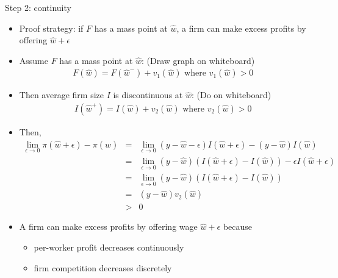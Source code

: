 \documentclass[9pt]{beamer}
\newcommand{\bit}{\begin{itemize}}
\newcommand{\eit}{\end{itemize}}
\newcommand{\rc}{\color{red}}
\begin{document}
\begin{frame}{Step 2: continuity}

\bit
\setlength\itemsep{1em}

\item Proof strategy: if $F$ has a mass point at $\hat w$, a firm can make excess profits by offering $\hat w + \epsilon$

\item Assume $F$ has a mass point at $\hat w$: {\rc (Draw graph on whiteboard)}
\begin{eqnarray}
F(\hat w) = F(\hat w^{-}) + v_1(\hat w) \text{  where $v_1(\hat w)>0$ }\nonumber
\end{eqnarray}

\item Then average firm size $I$ is discontinuous at $\hat w$: {\rc (Do on whiteboard)}
\begin{eqnarray}
I(\hat w^{+}) = I(\hat w) + v_2(\hat w) \text{  where $v_2(\hat w)>0$ } \nonumber
\end{eqnarray}

\item Then,
\begin{eqnarray}
\lim\limits_{\epsilon \rightarrow 0} \pi(\hat w+\epsilon)-\pi(\hat w) &=& \lim\limits_{\epsilon \rightarrow 0} (y-\hat w-\epsilon) I(\hat{w}+\epsilon) - (y-\hat w) I(\hat{w}) \nonumber \\
&=& \lim\limits_{\epsilon \rightarrow 0} (y-\hat w)(I(\hat{w}+\epsilon)-I(\hat{w})) -\epsilon I(\hat{w}+\epsilon) \nonumber \\
&=& \lim\limits_{\epsilon \rightarrow 0}  (y-\hat w)(I(\hat{w}+\epsilon)-I(\hat{w})) \nonumber \\ 
&=& (y-\hat w)v_2(\hat w)  \nonumber \\ 
&>& 0 \nonumber 
\end{eqnarray}

\item A firm can make excess profits by offering wage $\hat{w}+\epsilon$ because
\bit
	\item per-worker profit decreases continuously
	\item firm competition decreases discretely
\eit

\eit

\end{frame}
\end{document}
